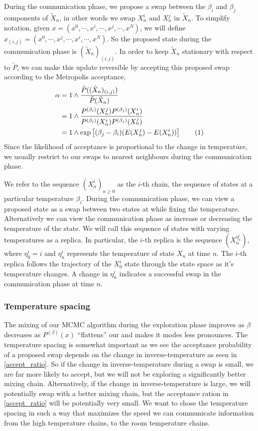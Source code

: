 \documentclass[12pt]{article}
\newcommand\numberthis{\addtocounter{equation}{1}\tag{\theequation}}
\begin{document}
During the communication phase, we propose a swap between the $\beta_i$ and $\beta_j$ components of $\tilde{X}_n$, in other words we swap $X^i_n$ and $X^j_n$ in $\tilde{X}_n$. To simplify notation, given $x=(x^0,\cdots,x^i,\cdots,x^j,\cdots, x^N)$, we will define $x_{(i,j)}=(x^0,\cdots,x^j,\cdots,x^i,\cdots,x^N)$. So the proposed state during the communication phase is $(\tilde{X}_n)_{(i,j)}$. In order to keep $\tilde{X}_n$ stationary with respect to $\tilde{P}$, we can make this update reversible by accepting this proposed swap according to the Metropolis acceptance,
\begin{align*}
\alpha
&=1\wedge\frac{\tilde{P}((\tilde{X}_n)_{(i,j)})}{\tilde{P}(\tilde{X}_n)}\\
&=1\wedge\frac{P^{(\beta_i)}(X_n^j)P^{(\beta_j)}(X_n^i)}{P^{(\beta_i)}(X_n^i)P^{(\beta_j)}(X_n^j)}\\
&=1\wedge\exp\left[(\beta_j-\beta_i)(E(X_n^j)-E(X_n^i))\right]\numberthis\label{accept_ratio}
\end{align*}
Since the likelihood of acceptance is proportional to the change in temperature, we usually restrict to our swaps to nearest neighbours during the communication phase.

We refer to the sequence $(X_n^{i})_{n\geq0}$ as the $i$-th chain, the sequence of states at a particular temperature $\beta_i$. During the communication phase, we can view a proposed state as a swap between two states at while fixing the temperature. Alternatively we can view the communication phase as increase or decreasing the temperature of the state. We will call this sequence of states with varying temperatures as a replica. In particular, the $i$-th replica is the sequence $(X_n^{\eta^i_n})$, where $\eta^i_0=i$ and $\eta^i_n$ represents the temperature of state $X_n$ at time $n$. The $i$-th replica follows the trajectory of the $X_0^{i}$ state through the state space as it's temperature changes. A change in $\eta^i_n$ indicates a successful swap in the communication phase at time $n$.

\subsubsection{Temperature spacing}
The mixing of our MCMC algorithm during the exploration phase improves as $\beta$ decreases as $P^{(\beta)}(x)$ ``flattens'' our and makes it modes less pronounces. The temperature spacing is somewhat important as we see the acceptance probability of a proposed swap depends on the change in inverse-temperature as seen in \eqref{accept_ratio}. So if the change in inverse-temperature during a swap is small, we are far more likely to accept, but we will not be exploring a significantly better mixing chain. Alternatively, if the change in inverse-temperature is large, we will potentially swap with a better mixing chain, but the acceptance ration in \eqref{accept_ratio} will be potentially very small. We want to chose the temperature spacing in such a way that maximizes the speed we can communicate information from the high temperature chains, to the room temperature chains.
\end{document}
